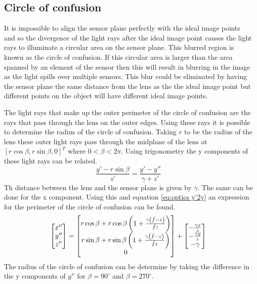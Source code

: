 \subsection{Circle of confusion}
It is impossible to align the sensor plane perfectly with the ideal image points and so the divergence of the light rays after the ideal image point causes the light rays to illuminate a circular area on the sensor plane. This blurred region is known as the circle of confusion. If this circular area is larger than the area spanned by an element of the sensor then this will result in blurring in the image as the light spills over multiple sensors. This blur could be eliminated by having the sensor plane the same distance from the lens as the the ideal image point but different points on the object will have different ideal image points.

The light rays that make up the outer perimeter of the circle of confusion are the rays that pass through the lens on the outer edges. Using these rays it is possible to determine the radius of the circle of confusion. Taking $r$ to be the radius of the lens these outer light rays pass through the midplane of the lens at $[r \cos \beta, r \sin \beta, 0]^T$ where $0<\beta<2\pi$. Using trigonometry the y components of these light rays can be related.
\begin{equation}
	\frac{y' - r \sin \beta}{z'}= \frac{y' - y''}{\gamma + z'}
\end{equation}
Th distance between the lens and the sensor plane is given by $\gamma$. The same can be done for the x component. Using this and equation \ref{eq:optics y'2y} an expression for the perimeter of the circle of confusion can be found.
\begin{equation}
\label{eq:cof}
	\begin{bmatrix}
	x'' \\
	y'' \\
	z''
	\end{bmatrix} =
	\begin{bmatrix}
	r \cos \beta + r \cos \beta \left( 1 + \frac{\gamma \left( \bar{f} - z \right)}{\bar{f} z} \right) \\
	r \sin \beta + r \sin \beta \left( 1 + \frac{\gamma \left( \bar{f} - z \right)}{\bar{f} z} \right) \\
	0
	\end{bmatrix} +
	\begin{bmatrix}
	-\frac{\gamma x}{z} \\
	-\frac{\gamma y}{z} \\
	- \gamma
	\end{bmatrix}
\end{equation}
The radius of the circle of confusion can be determine by taking the difference in the y components of $y''$ for $\beta=90 ^{\circ} $ and $\beta=270 ^{\circ}$.

